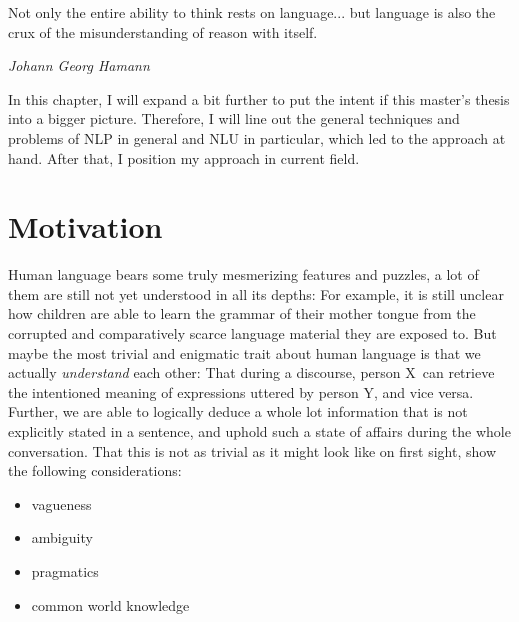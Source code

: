 \label{chap:1_intro}

\epigraph{Not only the entire ability to think rests on language... but language is also the crux of the misunderstanding of reason with itself.}{\textit{Johann Georg Hamann}}

In this chapter, I will expand a bit further to put the intent if this master's thesis into
a bigger picture. Therefore, I will line out the general techniques and problems of NLP in
general and NLU in particular, which led to the approach at hand. {\color{red} After that,
I position my approach in current field.}


\section{Motivation}

Human language bears some truly mesmerizing features and puzzles, a lot of them are still not
yet understood in all its depths: For example, it is still unclear how children are able to
learn the grammar of their mother tongue from the corrupted and comparatively scarce language
material they are exposed to.
But maybe the most trivial and enigmatic trait about human language is that
we actually \emph{understand} each other: That during a discourse, person X can retrieve
the intentioned meaning of expressions uttered by person Y, and vice versa.  Further, we are
able to logically deduce a whole lot information that is not explicitly stated in a sentence,
and uphold such a state of affairs during the whole conversation.
That this is not as trivial as it might look like on first sight, show the following
considerations:

\begin{itemize}
  \item vagueness
  \item ambiguity
  \item pragmatics
  \item common world knowledge
\end{itemize}

